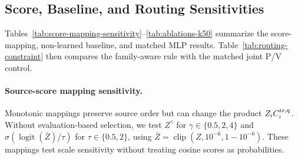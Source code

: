 \subsection{Score, Baseline, and Routing Sensitivities}

Tables~\ref{tab:score-mapping-sensitivity}--\ref{tab:ablations-k50} summarize the score-mapping, non-learned baseline, and matched MLP results.
Table~\ref{tab:routing-constraint} then compares the family-aware rule with the matched joint P/V control.

\paragraph{Source-score mapping sensitivity.}
Monotonic mappings preserve source order but can change the product $Z_iC_i^{\rm tr,q}$. Without evaluation-based selection, we test $Z^\gamma$ for $\gamma\in\{0.5,2,4\}$ and $\sigma(\operatorname{logit}(\bar Z)/\tau)$ for $\tau\in\{0.5,2\}$, using $\bar Z=\operatorname{clip}(Z,10^{-6},1-10^{-6})$. These mappings test scale sensitivity without treating cosine scores as probabilities.

